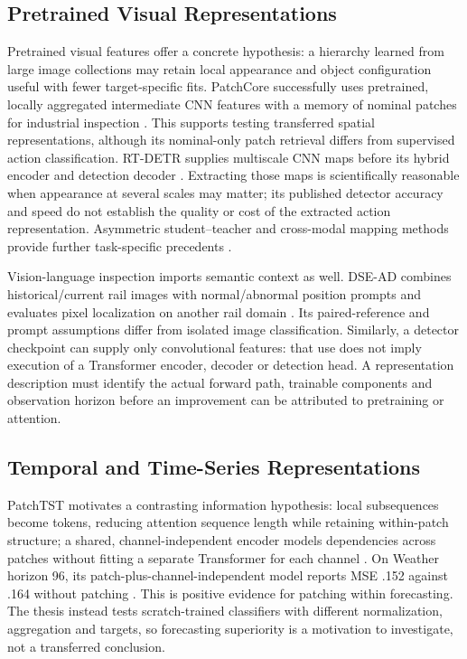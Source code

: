 \subsection{Pretrained Visual Representations}
Pretrained visual features offer a concrete hypothesis: a hierarchy learned from large image collections may retain local appearance and object configuration useful with fewer target-specific fits. PatchCore successfully uses pretrained, locally aggregated intermediate CNN features with a memory of nominal patches for industrial inspection \citep[Section~3]{Roth2022Towards}. This supports testing transferred spatial representations, although its nominal-only patch retrieval differs from supervised action classification. RT-DETR supplies multiscale CNN maps before its hybrid encoder and detection decoder \citep[Sections~4.1--4.2]{Zhao2024RTDETR}. Extracting those maps is scientifically reasonable when appearance at several scales may matter; its published detector accuracy and speed do not establish the quality or cost of the extracted action representation. Asymmetric student--teacher and cross-modal mapping methods provide further task-specific precedents \citep{Rudolph2023Asymmetric,Costanzino2024Multimodal}.

Vision-language inspection imports semantic context as well. DSE-AD combines historical/current rail images with normal/abnormal position prompts and evaluates pixel localization on another rail domain \citep{P031}. Its paired-reference and prompt assumptions differ from isolated image classification. Similarly, a detector checkpoint can supply only convolutional features: that use does not imply execution of a Transformer encoder, decoder or detection head. A representation description must identify the actual forward path, trainable components and observation horizon before an improvement can be attributed to pretraining or attention.

\subsection{Temporal and Time-Series Representations}
PatchTST motivates a contrasting information hypothesis: local subsequences become tokens, reducing attention sequence length while retaining within-patch structure; a shared, channel-independent encoder models dependencies across patches without fitting a separate Transformer for each channel \citep[Sections~3.1--3.2]{Nie2023PatchTST}. On Weather horizon 96, its patch-plus-channel-independent model reports MSE .152 against .164 without patching \citep[Table~7]{Nie2023PatchTST}. This is positive evidence for patching within forecasting. The thesis instead tests scratch-trained classifiers with different normalization, aggregation and targets, so forecasting superiority is a motivation to investigate, not a transferred conclusion.

